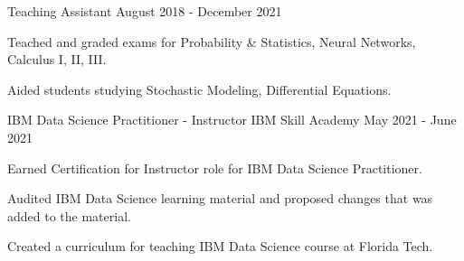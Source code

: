 \begin{cventries}
	\cventry
	{Teaching Assistant}
	{}
	{}
	{August 2018 - December 2021}
	{\begin{cvitems}
			\item {Teached and graded exams for Probability \& Statistics, Neural Networks, Calculus I, II, III.}
			\item {Aided students studying Stochastic Modeling, Differential Equations.}
		\end{cvitems}}
	\vspace{-3mm}
		
	\cventry
	{IBM Data Science Practitioner - Instructor}
	{IBM Skill Academy}
	{}
	{May 2021 - June 2021}
	{\begin{cvitems}
			\item {Earned Certification for Instructor role for IBM Data Science Practitioner.}
			\item {Audited IBM Data Science learning material and proposed changes that was added to the material.}
			\item {Created a curriculum for teaching IBM Data Science course at Florida Tech.}
		\end{cvitems}}
\end{cventries}
\vspace{-4mm}
